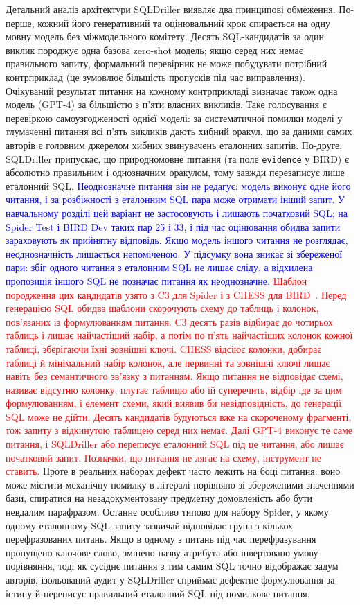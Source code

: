 \documentclass[a4paper,14pt,oneside]{extreport}
\begin{document}
Детальний аналіз архітектури SQLDriller виявляє два принципові обмеження. По-перше, кожний його генеративний та оцінювальний крок спирається на одну мовну модель без міжмодельного комітету. Десять SQL-кандидатів за один виклик породжує одна базова zero-shot модель; якщо серед них немає правильного запиту, формальний перевірник не може побудувати потрібний контрприклад (це зумовлює більшість пропусків під час виправлення). Очікуваний результат питання на кожному контрприкладі визначає також одна модель (GPT-4) за більшістю з п’яти власних викликів. Таке голосування є перевіркою самоузгодженості однієї моделі: за систематичної помилки моделі у тлумаченні питання всі п’ять викликів дають хибний оракул, що за даними самих авторів є головним джерелом хибних звинувачень еталонних запитів. По-друге, SQLDriller припускає, що природномовне питання (та поле \texttt{evidence} у BIRD) є абсолютно правильним і однозначним оракулом, тому завжди перезаписує лише еталонний SQL. \textcolor{blue}{Неоднозначне питання він не редагує: модель виконує одне його читання, і за розбіжності з еталонним SQL пара може отримати інший запит. У навчальному розділі цей варіант не застосовують і лишають початковий SQL; на Spider Test і BIRD Dev таких пар 25 і 33, і під час оцінювання обидва запити зараховують як прийнятну відповідь. Якщо модель іншого читання не розглядає, неоднозначність лишається непоміченою. У підсумку вона зникає зі збереженої пари: збіг одного читання з еталонним SQL не лишає сліду, а відхилена пропозиція іншого SQL не позначає питання як неоднозначне.} \textcolor{red}{Шаблон породження цих кандидатів узято з C3 для Spider і з CHESS для BIRD~\cite{dong2023c3,talaei2024chess,yang2025sqldriller}. Перед генерацією SQL обидва шаблони скорочують схему до таблиць і колонок, пов’язаних із формулюванням питання. C3 десять разів відбирає до чотирьох таблиць і лишає найчастіший набір, а потім по п’ять найчастіших колонок кожної таблиці, зберігаючи їхні зовнішні ключі. CHESS відсіює колонки, добирає таблиці й мінімальний набір колонок, але первинні та зовнішні ключі лишає навіть без семантичного зв’язку з питанням. Якщо питання не відповідає схемі, називає відсутню колонку, плутає таблицю або їй суперечить, відбір іде за цим формулюванням, і елемент схеми, який виявив би невідповідність, до генерації SQL може не дійти. Десять кандидатів будуються вже на скороченому фрагменті, тож запиту з відкинутою таблицею серед них немає. Далі GPT-4 виконує те саме питання, і SQLDriller або переписує еталонний SQL під це читання, або лишає початковий запит. Позначки, що питання не лягає на схему, інструмент не ставить.} Проте в реальних наборах дефект часто лежить на боці питання: воно може містити механічну помилку в літералі порівняно зі збереженими значеннями бази, спиратися на незадокументовану предметну домовленість або бути невдалим парафразом. Останнє особливо типово для набору Spider, у якому одному еталонному SQL-запиту зазвичай відповідає група з кількох перефразованих питань. Якщо в одному з питань під час перефразування пропущено ключове слово, змінено назву атрибута або інвертовано умову порівняння, тоді як сусіднє питання з тим самим SQL точно відображає задум авторів, ізольований аудит у SQLDriller сприймає дефектне формулювання за істину й переписує правильний еталонний SQL під помилкове питання.
\end{document}
